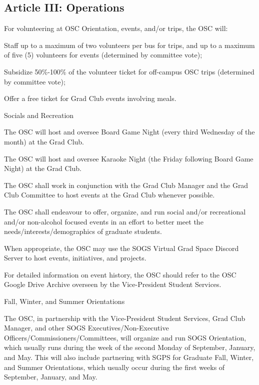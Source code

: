 \subsection{Article III: Operations}
\begin{longenum}[ label*=\thesubsection.\arabic*., align=left] 
	\item For volunteering at OSC Orientation, events, and/or trips, the OSC will:
		\begin{longenum}[label*=\arabic*., align=left]
		\item Staff up to a maximum of two volunteers per bus for trips, and up to a maximum of five (5) volunteers for events (determined by committee vote);
		\item Subsidize 50\%-100\% of the volunteer ticket for off-campus OSC trips (determined by committee vote);
		\item Offer a free ticket for Grad Club events involving meals.
		\end{longenum}
	\item Socials and Recreation
		\begin{longenum}[label*=\arabic*., align=left]
		\item The OSC will host and oversee Board Game Night (every third Wednesday of the month) at the Grad Club.
		\item The OSC will host and oversee Karaoke Night (the Friday following Board Game Night) at the Grad Club.
		\item The OSC shall work in conjunction with the Grad Club Manager and the Grad Club Committee to host events at the Grad Club whenever possible.		
		\item The OSC shall endeavour to offer, organize, and run social and/or recreational and/or non-alcohol focused events in an effort to better meet the needs/interests/demographics of graduate students.		
		\item When appropriate, the OSC may use the SOGS Virtual Grad Space Discord Server to host events, initiatives, and projects.		
		\item For detailed information on event history, the OSC should refer to the OSC Google Drive Archive overseen by the Vice-President Student Services.			
		\end{longenum}
	\item Fall, Winter, and Summer Orientations
		\begin{longenum}[label*=\arabic*., align=left]
		\item The OSC, in partnership with the Vice-President Student Services, Grad Club Manager, and other SOGS Executives/Non-Executive Officers/Commissioners/Committees, will organize and run SOGS Orientation, which usually runs during the week of the second Monday of September, January, and May. This will also include partnering with SGPS for Graduate Fall, Winter, and Summer Orientations, which usually occur during the first weeks of September, January, and May.

\end{longenum}
\end{longenum}
